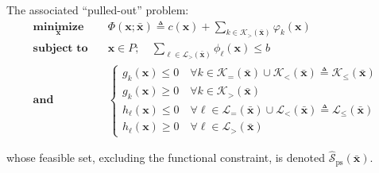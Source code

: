 \documentclass[aspectratio=169,xcolor=dvipsnames]{beamer}
\begin{document}
\begin{frame}
  \footnotesize
  \setlength{\abovedisplayskip}{4pt}
  \setlength{\belowdisplayskip}{4pt}

  The associated ``pulled-out'' problem:
  \[
    \begin{aligned}
      \operatorname*{\textbf{minimize}}_{\mathbf{x}}\quad
      &\Phi(\mathbf{x};\bar{\mathbf{x}})\triangleq c(\mathbf{x})
        +\sum_{k\in\mathcal{K}_{>}(\bar{\mathbf{x}})}\varphi_k(\mathbf{x})\\[2pt]
      \operatorname*{\textbf{subject to}}\quad
      &\mathbf{x}\in P;\quad
        \sum_{\ell\in\mathcal{L}_{>}(\bar{\mathbf{x}})}\phi_\ell(\mathbf{x})
        \leq b\\[2pt]
      \textbf{and}\quad
      &\left\{
        \begin{array}{l}
          g_k(\mathbf{x})\leq 0\quad\forall k\in
            \mathcal{K}_{=}(\bar{\mathbf{x}})\cup\mathcal{K}_{<}(\bar{\mathbf{x}})
            \triangleq\mathcal{K}_{\leq}(\bar{\mathbf{x}})\\[3pt]
          g_k(\mathbf{x})\geq 0\quad\forall k\in
            \mathcal{K}_{>}(\bar{\mathbf{x}})\\[3pt]
          h_\ell(\mathbf{x})\leq 0\quad\forall\ell\in
            \mathcal{L}_{=}(\bar{\mathbf{x}})\cup\mathcal{L}_{<}(\bar{\mathbf{x}})
            \triangleq\mathcal{L}_{\leq}(\bar{\mathbf{x}})\\[3pt]
          h_\ell(\mathbf{x})\geq 0\quad\forall\ell\in
            \mathcal{L}_{>}(\bar{\mathbf{x}})
        \end{array}\right.
    \end{aligned}
  \]

  \vspace{0.04cm}
  whose feasible set, excluding the functional constraint, is denoted
  $\widehat{\mathcal{S}}_{\mathrm{ps}}(\bar{\mathbf{x}})$.
\end{frame}



\end{document}

